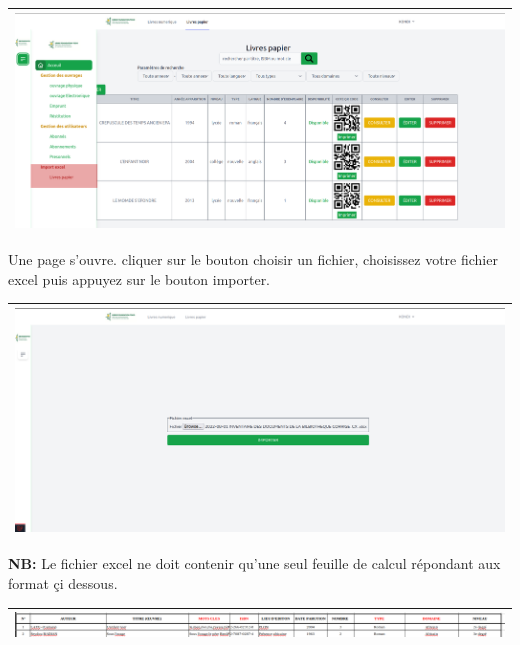 \documentclass[12pt,a4paper]{article}
\begin{document}
\begin{center}
\begin{tabular}{|p{17cm}|}
\hline 
\includegraphics[width=\textwidth]{img/import_excel_menu.png} \\ 
\hline 
\end{tabular} 
\end{center}

Une page s'ouvre. cliquer sur le bouton choisir un fichier,
choisissez votre fichier excel puis appuyez sur le bouton importer.\\
\begin{center}
\begin{tabular}{|p{17cm}|}
\hline 
\includegraphics[width=\textwidth]{img/import_excel_content.png} \\ 
\hline 
\end{tabular} 
\end{center}

\textbf{NB:} Le fichier excel ne doit contenir qu'une seul feuille de calcul répondant
aux format çi dessous.\\
\begin{center}
\begin{tabular}{|p{17cm}|}
\hline 
\includegraphics[width=\textwidth]{img/format_excel.png} \\ 
\hline 
\end{tabular} 
\end{center}
\end{document}
